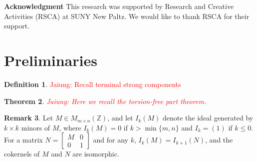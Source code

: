 \documentclass[11pt,reqno]{amsart}
\DeclareMathOperator{\Pic}{Pic}
\DeclareMathOperator{\Jac}{Jac}
\theoremstyle{definition}
\newtheorem{mydef}{Definition}[section]
\newtheorem{rmk}[mydef]{Remark}
\theoremstyle{plain}
\newtheorem{mytheorem}[mydef]{Theorem}
\begin{document}


\bigskip


\textbf{Acknowledgment}\hspace{0.1cm} This research was supported by Research and Creative Activities (RSCA) at SUNY New Paltz. We would like to thank RSCA for their support.

\section{Preliminaries}

\begin{mydef}
	\textcolor{red}{Jaiung: Recall terminal strong components}
\end{mydef}

\begin{mytheorem}
\textcolor{red}{Jaiung: Here we recall \cite{wagner2000critical} the torsion-free part theorem. }
\end{mytheorem}

		\begin{rmk}\label{remark: embedding}
	Let $M \in M_{m \times n}(\mathbb{Z})$, 
	and let $I_k(M)$ denote the ideal generated by $k \times k$ minors of $M$, 
	where $I_k(M) = 0$ if $k > \min\{m,n\}$ and $I_k = (1)$ if $k \le 0$. 
	For a matrix $N = \left[ \begin{array}{c|c}
		M & 0 \\
		\hline
		0 & 1
	\end{array} \right]$ and for any $k$, $I_k(M) = I_{k+1}(N)$, and the cokernels of $M$ and $N$ are isomorphic. 
\end{rmk}
\end{document}

